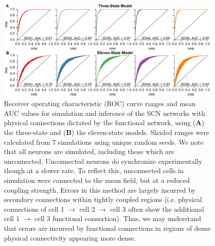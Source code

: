 \begin{figure}[p]
    \begin{center}
        \includegraphics[width=6.5in]{chap3/figures/s8.pdf}
    \end{center}
    \caption{\label{fig:s8} Receiver operating characteristic (ROC) curve ranges and mean AUC values for simulation and inference of the SCN networks with physical connections dictated by the functional network, using (\textbf{A}) the three-state \cite{Gonze2006,Schroder2012} and (\textbf{B}) the eleven-state \cite{Abel2015a} models. Shaded ranges were calculated from 7 simulations using unique random seeds. We note that all neurons are simulated, including those which are unconnected. Unconnected neurons do synchronize experimentally though at a slower rate. To reflect this, unconnected cells in simulation were connected to the mean field, but at a reduced coupling strength. Errors in this method are largely incurred by secondary connections within tightly coupled regions (i.e. physical connections of cell 1 $\rightarrow$ cell 2 $\rightarrow$ cell 3 often show the additional cell 1 $\rightarrow$ cell 3 functional connection). Thus, we may understand that errors are incurred by functional connections in regions of dense physical connectivity appearing more dense.
}
\end{figure}




